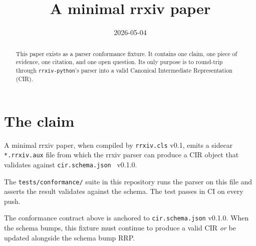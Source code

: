 \documentclass{rrxiv}
\title{A minimal rrxiv paper}
\date{2026-05-04}
\begin{document}
\maketitle

\begin{abstract}
This paper exists as a parser conformance fixture. It contains one claim,
one piece of evidence, one citation, and one open question. Its only
purpose is to round-trip through \texttt{rrxiv-python}'s parser into a
valid Canonical Intermediate Representation (CIR).
\end{abstract}

\section{The claim}
\label{sec:claim}

\begin{claim}
\label{claim:fixture}
A minimal rrxiv paper, when compiled by \texttt{rrxiv.cls} v0.1, emits a
sidecar \texttt{*.rrxiv.aux} file from which the rrxiv parser can produce
a CIR object that validates against \texttt{cir.schema.json}~\cite{rrxiv-cir-schema} v0.1.0.
\end{claim}

\begin{evidence}
\label{ev:ci-test}
The \texttt{tests/conformance/} suite in this repository runs the parser
on this file and asserts the result validates against the schema.
The test passes in CI on every push.
\end{evidence}

\begin{openquestion}
\label{oq:schema-bumps}
The conformance contract above is anchored to \texttt{cir.schema.json}
v0.1.0. When the schema bumps, this fixture must continue to produce a
valid CIR \emph{or} be updated alongside the schema bump RRP.
\end{openquestion}



\end{document}
